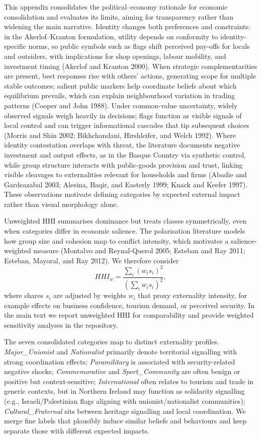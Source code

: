 \documentclass[
  a4paper,
]{article}
\begin{document}
This appendix consolidates the political--economy rationale for economic
consolidation and evaluates its limits, aiming for transparency rather
than widening the main narrative. Identity changes both preferences and
constraints: in the Akerlof--Kranton formulation, utility depends on
conformity to identity-specific norms, so public symbols such as flags
shift perceived pay-offs for locals and outsiders, with implications for
shop openings, labour mobility, and investment timing (Akerlof and
Kranton 2000). When strategic complementarities are present, best
responses rise with others' actions, generating scope for multiple
stable outcomes; salient public markers help coordinate beliefs about
which equilibrium prevails, which can explain neighbourhood variation in
trading patterns (Cooper and John 1988). Under common-value uncertainty,
widely observed signals weigh heavily in decisions; flags function as
visible signals of local control and can trigger informational cascades
that tip subsequent choices (Morris and Shin 2002; Bikhchandani,
Hirshleifer, and Welch 1992). Where identity contestation overlaps with
threat, the literature documents negative investment and output effects,
as in the Basque Country via synthetic control, while group structure
interacts with public-goods provision and trust, linking visible
cleavages to externalities relevant for households and firms (Abadie and
Gardeazabal 2003; Alesina, Baqir, and Easterly 1999; Knack and Keefer
1997). These observations motivate defining categories by expected
external impact rather than visual morphology alone.

Unweighted HHI summarises dominance but treats classes symmetrically,
even when categories differ in economic salience. The polarisation
literature models how group size and cohesion map to conflict intensity,
which motivates a salience-weighted measure (Montalvo and Reynal-Querol
2005; Esteban and Ray 2011; Esteban, Mayoral, and Ray 2012). We
therefore consider \[
HHI_w = \frac{\sum_i (w_i s_i)^2}{\left(\sum_i w_i s_i\right)^2},
\] where shares \(s_i\) are adjusted by weights \(w_i\) that proxy
externality intensity, for example effects on business confidence,
tourism demand, or perceived security. In the main text we report
unweighted HHI for comparability and provide weighted sensitivity
analyses in the repository.

The seven consolidated categories map to distinct externality profiles.
\emph{Major\_Unionist} and \emph{Nationalist} primarily denote
territorial signalling with strong coordination effects;
\emph{Paramilitary} is associated with security-related negative shocks;
\emph{Commemorative} and \emph{Sport\_Community} are often benign or
positive but context-sensitive; \emph{International} often relates to
tourism and trade in generic contexts, but in Northern Ireland may
function as solidarity signalling (e.g., Israeli/Palestinian flags
aligning with unionist/nationalist communities);
\emph{Cultural\_Fraternal} sits between heritage signalling and local
coordination. We merge fine labels that plausibly induce similar beliefs
and behaviours and keep separate those with different expected impacts.
\end{document}
